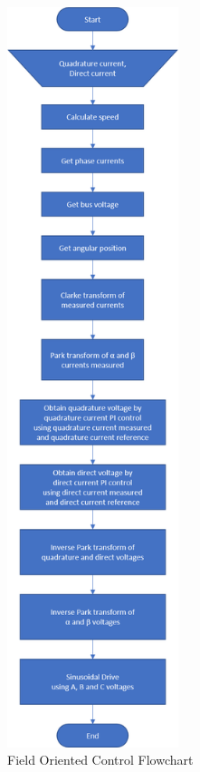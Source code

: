\vfill
\begin{figure}[htbp]
\centering
\includegraphics[width=5cm]{Images/flowcharts/foc_flow.png} 
\caption[Field Oriented Control Flowchart]{Field Oriented Control Flowchart}
\label{fig:foc_flow}
\end{figure}
\vfill



